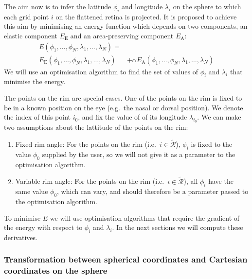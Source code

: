 \documentclass{article}
\begin{document}
The aim now is to infer the latitude $\phi_i$ and longitude
$\lambda_i$ on the sphere to which each grid point $i$ on the
flattened retina is projected.  It is proposed to achieve this aim by
minimising an energy function which depends on two components, an
elastic component $E_\mathrm{E}$ and an area-preserving component
$E_\mathrm{A}$:
\begin{equation}
  \begin{split}
  E(\phi_1,\dots,\phi_N,\lambda_1,\dots,\lambda_N) = & \\
  E_\mathrm{E}(\phi_1,\dots,\phi_N,\lambda_1,\dots,\lambda_N) 
  & + \alpha E_\mathrm{A}(\phi_1,\dots,\phi_N,\lambda_1,\dots,\lambda_N) 
  \end{split}
\end{equation}
We will use an optimisation algorithm to find the set of values of
$\phi_i$ and $\lambda_i$ that minimise the energy.

The points on the rim are special cases. One of the points on the rim
is fixed to be in a known position on the eye (e.g.~the nasal or
dorsal position). We denote the index of this point $i_0$, and fix the
value of of its longitude $\lambda_{i_0}$. We can make two assumptions
about the lattitude of the points on the rim:
\begin{enumerate}
\item Fixed rim angle: For the points on the rim (i.e.~$i \in
  \mathcal{\tilde R}$), $\phi_i$ is fixed to the value $\phi_0$
  supplied by the user, so we will not give it as a parameter to the
  optimisation algorithm.
\item Variable rim angle: For the points on the rim (i.e.~$i \in
  \mathcal{\tilde R}$), all $\phi_i$ have the same value $\phi_0$,
  which can vary, and should therefore be a parameter passed to the
  optimisation algorithm.
\end{enumerate}

To minimise $E$ we will use optimisation algorithms that require the
gradient of the energy with respect to $\phi_i$ and $\lambda_i$. In
the next sections we will compute these derivatives.

\subsubsection{Transformation between spherical coordinates and Cartesian
  coordinates on the sphere}
\label{retistruct-algorithm:sec:transf-betw-spher}
\end{document}
